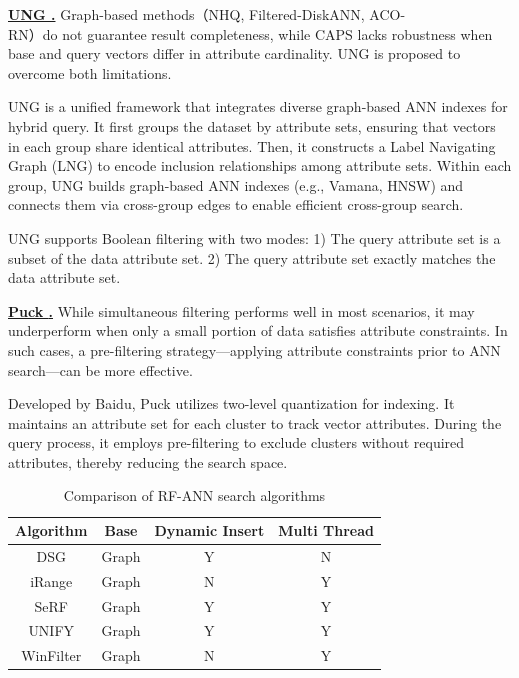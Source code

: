 \documentclass[sigconf, nonacm]{acmart}
\begin{document}
\begin{sloppypar}
\vspace{1em}
\noindent\textbf{\underline{UNG \cite{UNG}.}} 
Graph-based methods（NHQ, Filtered-DiskANN, ACO-\\RN）do not guarantee result completeness, while CAPS lacks robustness when base and query vectors differ in attribute cardinality. UNG is proposed to overcome both limitations.

UNG is a unified framework that integrates diverse graph-based ANN indexes for hybrid query. It first groups the dataset by attribute sets, ensuring that vectors in each group share identical attributes. Then, it constructs a Label Navigating Graph (LNG) to encode inclusion relationships among attribute sets. Within each group, UNG builds graph-based ANN indexes (e.g., Vamana, HNSW) and connects them via cross-group edges to enable efficient cross-group search.

UNG supports Boolean filtering with two modes:  
1) The query attribute set is a subset of the data attribute set.  
2) The query attribute set exactly matches the data attribute set.



\vspace{1em}
\noindent\textbf{\underline{Puck \cite{puck}.}}  
While simultaneous filtering performs well in most scenarios, it may underperform when only a small portion of data satisfies attribute constraints. In such cases, a pre-filtering strategy—applying attribute constraints prior to ANN search—can be more effective.

Developed by Baidu, Puck utilizes two-level quantization for indexing. It maintains an attribute set for each cluster to track vector attributes. During the query process, it employs pre-filtering to exclude clusters without required attributes, thereby reducing the search space.


\setlength{\textfloatsep}{0.1cm}
\setlength{\floatsep}{0cm}
\begin{table}[t]
	\centering
        \setlength{\abovecaptionskip}{0.05cm}
        \setlength{\textfloatsep}{0cm}
	\caption{Comparison of RF-ANN search algorithms}
	\small	%
	\label{tab:range_algo}
    \begin{tabular}{|c|c|c|c|}
		\hline
		\textbf{Algorithm} & \textbf{Base} & \textbf{Dynamic Insert} & \textbf{Multi Thread} \\
		\hline
        DSG & Graph & Y & N \\
        iRange & Graph & N & Y \\
        SeRF & Graph & Y & Y \\
		UNIFY & Graph & Y & Y \\
		WinFilter & Graph & N & Y  \\
		\hline
	\end{tabular}


\end{table}
\end{sloppypar}
\end{document}
